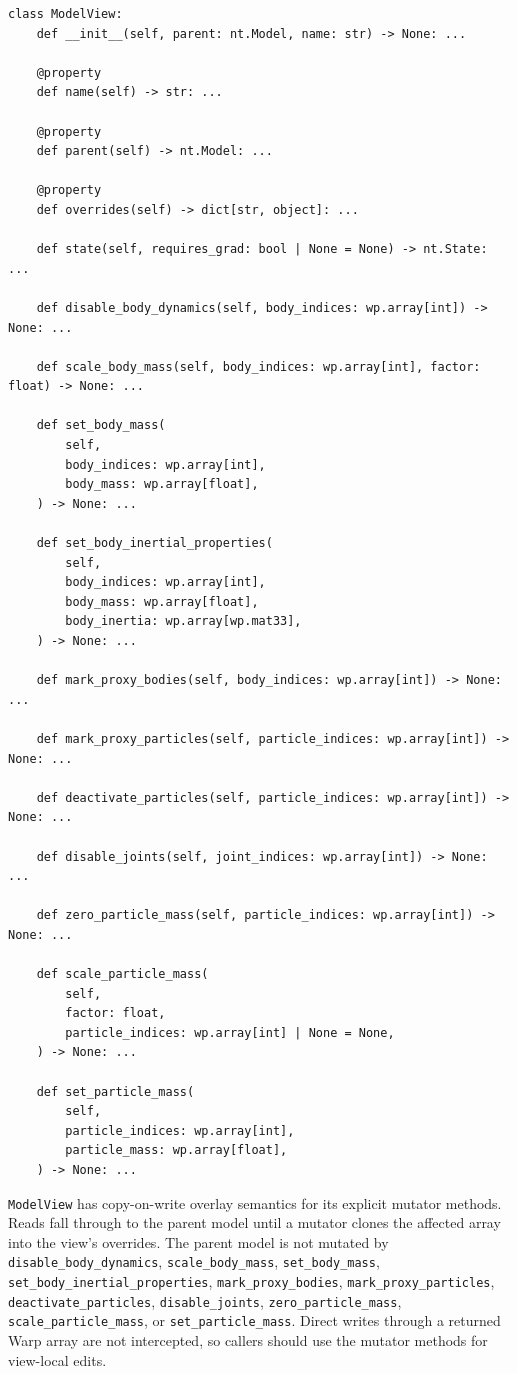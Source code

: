 \documentclass[11pt]{article}
\begin{document}
\begin{verbatim}
class ModelView:
    def __init__(self, parent: nt.Model, name: str) -> None: ...

    @property
    def name(self) -> str: ...

    @property
    def parent(self) -> nt.Model: ...

    @property
    def overrides(self) -> dict[str, object]: ...

    def state(self, requires_grad: bool | None = None) -> nt.State: ...

    def disable_body_dynamics(self, body_indices: wp.array[int]) -> None: ...

    def scale_body_mass(self, body_indices: wp.array[int], factor: float) -> None: ...

    def set_body_mass(
        self,
        body_indices: wp.array[int],
        body_mass: wp.array[float],
    ) -> None: ...

    def set_body_inertial_properties(
        self,
        body_indices: wp.array[int],
        body_mass: wp.array[float],
        body_inertia: wp.array[wp.mat33],
    ) -> None: ...

    def mark_proxy_bodies(self, body_indices: wp.array[int]) -> None: ...

    def mark_proxy_particles(self, particle_indices: wp.array[int]) -> None: ...

    def deactivate_particles(self, particle_indices: wp.array[int]) -> None: ...

    def disable_joints(self, joint_indices: wp.array[int]) -> None: ...

    def zero_particle_mass(self, particle_indices: wp.array[int]) -> None: ...

    def scale_particle_mass(
        self,
        factor: float,
        particle_indices: wp.array[int] | None = None,
    ) -> None: ...

    def set_particle_mass(
        self,
        particle_indices: wp.array[int],
        particle_mass: wp.array[float],
    ) -> None: ...
\end{verbatim}

\texttt{ModelView} has copy-on-write overlay semantics for its explicit mutator
methods. Reads fall through to the parent model until a mutator clones the affected
array into the view's overrides. The parent model is not mutated by
\texttt{disable\_body\_dynamics}, \texttt{scale\_body\_mass},
\texttt{set\_body\_mass}, \texttt{set\_body\_inertial\_properties},
\texttt{mark\_proxy\_bodies}, \texttt{mark\_proxy\_particles},
\texttt{deactivate\_particles}, \texttt{disable\_joints},
\texttt{zero\_particle\_mass}, \texttt{scale\_particle\_mass}, or
\texttt{set\_particle\_mass}. Direct writes through a returned Warp array are
not intercepted, so callers should use the mutator methods for view-local edits.
\end{document}
